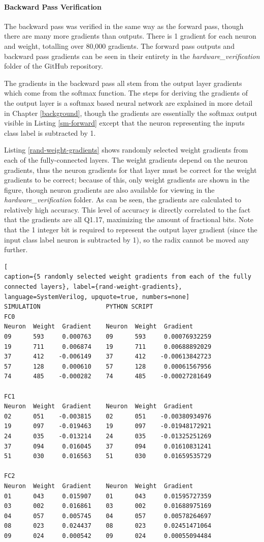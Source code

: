 \paragraph{Backward Pass Verification}
The backward pass was verified in the same way as the forward pass, though there are many more gradients than outputs. There is 1 gradient for each neuron and weight, totalling over 80,000 gradients. The forward pass outputs and backward pass gradients can be seen in their entirety in the \textit{hardware\_verification} folder of the GitHub repository.

The gradients in the backward pass all stem from the output layer gradients which come from the softmax function. The steps for deriving the gradients of the output layer is a softmax based neural network are explained in more detail in Chapter \ref{background}, though the gradients are essentially the softmax output visible in Listing \ref{sm-forward} except that the neuron representing the inputs class label is subtracted by 1. 

Listing \ref{rand-weight-gradients} shows randomly selected weight gradients from each of the fully-connected layers. The weight gradients depend on the neuron gradients, thus the neuron gradients for that layer must be correct for the weight gradients to be correct; because of this, only weight gradients are shown in the figure, though neuron gradients are also available for viewing in the \textit{hardware\_verification} folder. As can be seen, the gradients are calculated to relatively high accuracy. This level of accuracy is directly correlated to the fact that the gradients are all Q1.17, maximizing the amount of fractional bits. Note that the 1 integer bit is required to represent the output layer gradient (since the input class label neuron is subtracted by 1), so the radix cannot be moved any further.


\begin{lstlisting}[
caption={5 randomly selected weight gradients from each of the fully connected layers}, label={rand-weight-gradients}, language=SystemVerilog, upquote=true, numbers=none]
SIMULATION                  PYTHON SCRIPT
FC0
Neuron	Weight	Gradient	Neuron	Weight 	Gradient
09 		593 	0.000763    09   	593 	0.00076932259
19 		711 	0.006874    19 		711	 	0.00688892029
37 		412    -0.006149    37  	412    -0.00613842723
57 		128 	0.000610    57  	128 	0.00061567956
74 		485    -0.000282    74  	485    -0.00027281649

FC1
Neuron	Weight	Gradient	Neuron	Weight 	Gradient
02 		051    -0.003815    02   	051    -0.00380934976
19 		097    -0.019463    19  	097    -0.01948172921
24 		035    -0.013214    24  	035    -0.01325251269
37 		094 	0.016045    37  	094  	0.01610831241
51 		030 	0.016563    51  	030  	0.01659535729

FC2
Neuron	Weight	Gradient	Neuron	Weight 	Gradient
01  	043 	0.015907    01 		043 	0.01595727359
03  	002 	0.016861    03 		002  	0.01688975169
04  	057 	0.005745    04 		057 	0.00578264697
08  	023 	0.024437    08 		023 	0.02451471064
09  	024 	0.000542    09 		024 	0.00055094484
\end{lstlisting}

